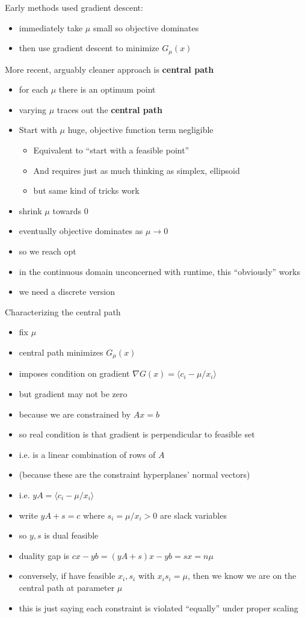 \documentclass{article}
\begin{document}
Early methods used gradient descent:
\begin{itemize}
\item immediately take $\mu$ small so objective dominates
\item then use gradient descent to minimize $G_\mu(x)$
\end{itemize}
 
More recent, arguably cleaner approach is \textbf{central path}
\begin{itemize}
\item for each $\mu$ there is an optimum point
\item varying $\mu$ traces out the \textbf{central path}
\item Start with $\mu$ huge, objective function term negligible
\begin{itemize}
\item Equivalent to ``start with a feasible point''
\item And requires just as much thinking as simplex, ellipsoid
\item but same kind of tricks work
\end{itemize}
\item shrink $\mu$ towards 0
\item eventually objective dominates as $\mu \rightarrow 0$
\item so we reach opt
\item in the continuous domain unconcerned with runtime, this
 ``obviously'' works
\item we need a discrete version
\end{itemize}

Characterizing the central path
\begin{itemize}
\item fix $\mu$
\item central path minimizes $G_\mu(x)$ 
\item imposes condition on gradient $\nabla G(x) = \langle c_i-\mu/x_i \rangle$
\item but gradient may not be zero
\item because we are constrained by $Ax=b$
\item so real condition is that gradient is perpendicular to feasible
 set
\item i.e. is a linear combination of rows of $A$
\item (because these are the constraint hyperplanes' normal vectors)
\item i.e. $yA = \langle c_i-\mu/x_i \rangle$
\item write $yA+s=c$ where $s_i =\mu/x_i > 0$ are slack variables
\item so $y,s$ is dual feasible
\item duality gap is $cx-yb = (yA+s)x - yb = sx = n\mu$
\item conversely, if have feasible $x_i, s_i$ with $x_is_i=\mu$, then
 we know we are on the central path at parameter $\mu$
\item this is just saying each constraint is violated ``equally'' under proper scaling
\end{itemize}
\end{document}
